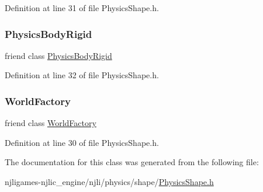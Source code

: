 Definition at line 31 of file Physics\+Shape.\+h.

\mbox{\label{classnjli_1_1_physics_shape_ada345e4f9c2a87f06868b74d30e94ad2}} 
\subsubsection{\texorpdfstring{Physics\+Body\+Rigid}{PhysicsBodyRigid}}
{\footnotesize\ttfamily friend class \mbox{\hyperlink{classnjli_1_1_physics_body_rigid}{Physics\+Body\+Rigid}}\hspace{0.3cm}{\ttfamily [friend]}}



Definition at line 32 of file Physics\+Shape.\+h.

\mbox{\label{classnjli_1_1_physics_shape_acb96ebb09abe8f2a37a915a842babfac}} 
\subsubsection{\texorpdfstring{World\+Factory}{WorldFactory}}
{\footnotesize\ttfamily friend class \mbox{\hyperlink{classnjli_1_1_world_factory}{World\+Factory}}\hspace{0.3cm}{\ttfamily [friend]}}



Definition at line 30 of file Physics\+Shape.\+h.



The documentation for this class was generated from the following file\+:\begin{DoxyCompactItemize}
\item 
njligames-\/njlic\+\_\+engine/njli/physics/shape/\mbox{\hyperlink{_physics_shape_8h}{Physics\+Shape.\+h}}\end{DoxyCompactItemize}
